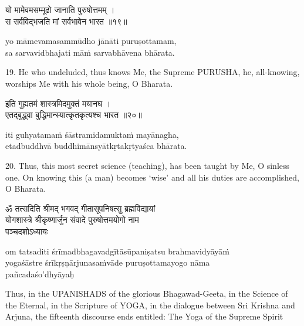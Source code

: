 \begin{gitaverse}
यो मामेवमसम्मूढो जानाति पुरुषोत्तमम् । \\
स सर्वविद्भजति मां सर्वभावेन भारत ॥१९॥
\end{gitaverse}

\begin{transliteration}
yo māmevamasammūdho jānāti puruṣottamam, \\
sa sarvavidbhajati māṁ sarvabhāvena bhārata.
\end{transliteration}

19. He who undeluded, thus knows Me, the Supreme PURUSHA, he, all-knowing,
worships Me with his whole being, O Bharata.

\begin{gitaverse}
इति गुह्यतमं शास्त्रमिदमुक्तं मयानघ । \\
एतद्बुद्ध्वा बुद्धिमान्स्यात्कृतकृत्यश्च भारत ॥२०॥
\end{gitaverse}

\begin{transliteration}
iti guhyatamaṁ śāstramidamuktaṁ mayānagha, \\
etadbuddhvā buddhimānsyātkṛtakṛtyaśca bhārata.
\end{transliteration}

20. Thus, this most secret science (teaching), has been taught by Me, O sinless
one. On knowing this (a man) becomes `wise' and all his duties are
accomplished, O Bharata.

\begin{gitaverse}
ॐ तत्सदिति श्रीमद् भगवद् गीतासूपनिषत्सु ब्रह्मविद्यायां \\
योगशास्त्रे श्रीकृष्णार्जुन संवादे पुरुषोत्तमयोगो नाम \\
पञ्चदशोऽध्यायः
\end{gitaverse}

\begin{transliteration}
om tatsaditi śrīmadbhagavadgītāsūpaniṣatsu brahmavidyāyāṁ \\
yogaśāstre śrīkṛṣṇārjunasaṁvāde puruṣottamayogo nāma \\
pañcadaśo'dhyāyaḥ
\end{transliteration}

Thus, in the UPANISHADS of the glorious Bhagawad-Geeta, in the Science of the
Eternal, in the Scripture of YOGA, in the dialogue between Sri Krishna and
Arjuna, the fifteenth discourse ends entitled: The Yoga of the Supreme Spirit
